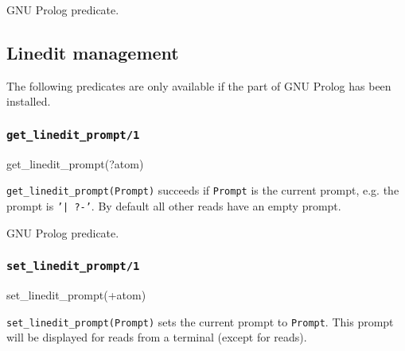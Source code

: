 \Portability

GNU Prolog predicate.

\subsection{Linedit management}
The following predicates are only available if the  part of
GNU Prolog has been installed.

\subsubsection{\texttt{get\_linedit\_prompt/1}}

\begin{TemplatesOneCol}
get\_linedit\_prompt(?atom)

\end{TemplatesOneCol}

\Description

\texttt{get\_linedit\_prompt(Prompt)} succeeds if \texttt{Prompt} is the
current  prompt, e.g. the  prompt is
\texttt{'| ?-'}. By default all other reads have an empty prompt.

\begin{PlErrors}


\end{PlErrors}

\Portability

GNU Prolog predicate.

\subsubsection{\texttt{set\_linedit\_prompt/1}}

\begin{TemplatesOneCol}
set\_linedit\_prompt(+atom)

\end{TemplatesOneCol}

\Description

\texttt{set\_linedit\_prompt(Prompt)} sets the current 
prompt to \texttt{Prompt}. This prompt will be displayed for reads from a
terminal (except for  reads).

\begin{PlErrors}



\end{PlErrors}

